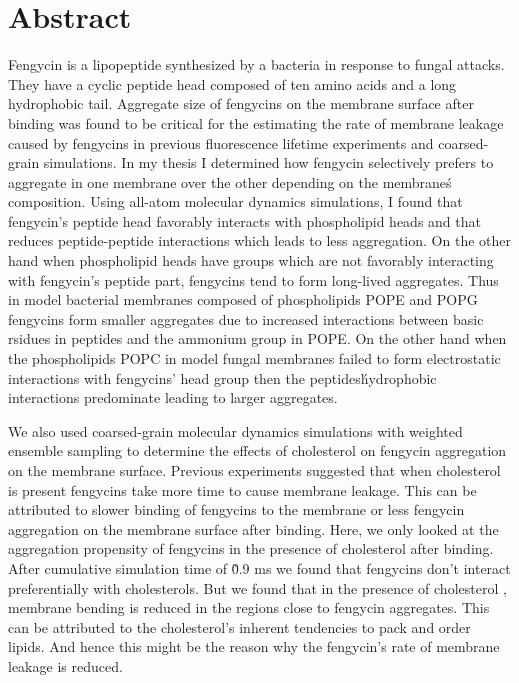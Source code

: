 \chapter*{Abstract}
Fengycin is a lipopeptide synthesized by a bacteria in response to fungal attacks. 
They have a cyclic peptide head composed of ten amino acids and a long hydrophobic 
tail. %
Aggregate size of fengycins on the membrane surface after binding was found to be critical for the estimating the rate of membrane leakage caused by fengycins 
in previous fluorescence lifetime experiments and coarsed-grain simulations.
In my thesis
I determined how fengycin selectively prefers to aggregate in one membrane over the
other depending on the membrane\'s composition. Using all-atom molecular dynamics simulations, I found that fengycin's peptide head favorably 
interacts with phospholipid heads and that reduces peptide-peptide interactions 
which leads to less aggregation. On the other hand when 
phospholipid heads have groups which are not favorably interacting with fengycin's peptide 
part, fengycins tend to form long-lived aggregates.
Thus in model bacterial membranes composed of phospholipids POPE and POPG
fengycins form smaller aggregates due to increased interactions between basic rsidues in peptides
and the ammonium group in POPE. On the other hand when the phospholipids POPC in model fungal membranes 
failed to form electrostatic interactions with fengycins' head group
then the peptides\' hydrophobic interactions predominate leading to larger aggregates.

We also used coarsed-grain molecular dynamics simulations with weighted ensemble 
sampling to determine the effects of cholesterol on fengycin aggregation on the 
membrane surface. Previous experiments suggested that when cholesterol is present
fengycins take more time to cause membrane leakage. This can be attributed to 
slower binding of fengycins to the membrane or less fengycin aggregation 
on the membrane surface after binding. 
Here, we only looked at the aggregation propensity
of fengycins in the presence of cholesterol after binding.
After cumulative simulation time of \~0.9 ms we found that fengycins don't interact 
preferentially with cholesterols.
But we found that in the presence of cholesterol , membrane bending is reduced
in the regions close to fengycin aggregates.
 This can be attributed to the cholesterol's inherent tendencies to pack
 and order lipids. And hence this might be the reason why the fengycin's rate of membrane leakage is reduced.
 
